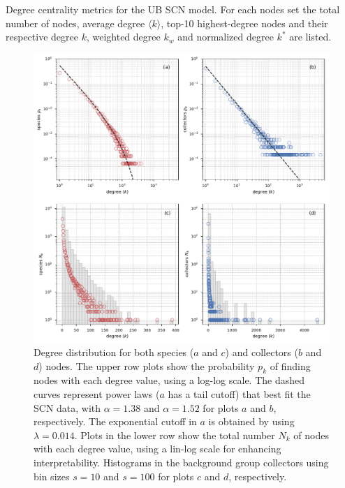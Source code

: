 \begin{table}[t]
\caption{ Degree centrality metrics for the UB SCN model. For each nodes set the total number of nodes, average degree $\langle k \rangle$, top-10 highest-degree nodes and their respective degree $k$, weighted degree $k_w$ and normalized degree $k^*$ are listed.}
\begin{center}
	
\end{center}
\label{table:ub_scn_degrees}
\end{table}

  \begin{figure}[t]
  	\centering
    \includegraphics[width=\linewidth]{figures/casestudy_ub/scn_degree_dist}
    \caption{Degree distribution for both species ($a$ and $c$) and collectors ($b$ and $d$) nodes. The upper row plots show the probability $p_k$ of finding nodes with each degree value, using a log-log scale. The dashed curves represent power laws ($a$ has a tail cutoff) that best fit the SCN data, with $\alpha=1.38$ and $\alpha=1.52$ for plots $a$ and $b$, respectively. The exponential cutoff in $a$ is obtained by using $\lambda=0.014$. Plots in the lower row show the total number $N_k$ of nodes with each degree value, using a lin-log scale for enhancing interpretability. Histograms in the background group collectors using bin sizes $s=10$ and $s=100$ for plots $c$ and $d$, respectively.}
    \label{fig:ub_scn_degree_dist}
  \end{figure}

